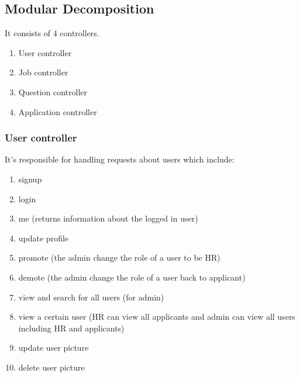 \subsection{Modular Decomposition}
It consists of 4 controllers.
\begin{enumerate}
    \item User controller
    \item Job controller
    \item Question controller
    \item Application controller
\end{enumerate}

\subsubsection{User controller}
It's responsible for handling requests about users which include:
\begin{enumerate}
    \item signup
    \item login
    \item me (returns information about the logged in user)
    \item update profile
    \item promote (the admin change the role of a user to be HR)
    \item demote (the admin change the role of a user back to applicant)
    \item view and search for all users (for admin)
    \item view a certain user (HR can view all applicants and admin can view all users including HR and applicants)
    \item update user picture
    \item delete user picture
\end{enumerate}

